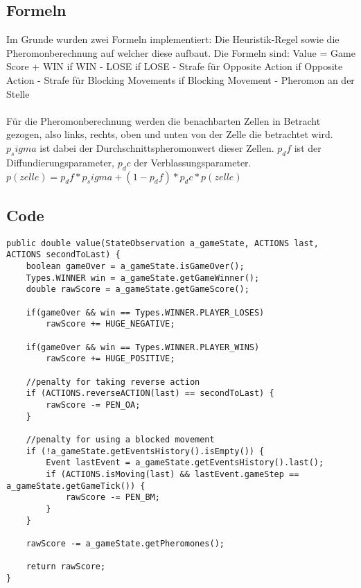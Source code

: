 \documentclass[a4paper]{article}
\begin{document}
\subsection{Formeln}
Im Grunde wurden zwei Formeln implementiert: Die Heuristik-Regel sowie die Pheromonberechnung auf welcher diese aufbaut.
Die Formeln sind:
Value = Game Score + WIN if WIN - LOSE if LOSE - Strafe für Opposite Action if Opposite Action - Strafe für Blocking Movements if Blocking Movement - Pheromon an der Stelle
\paragraph{}
Für die Pheromonberechnung werden die benachbarten Zellen in Betracht gezogen, also links, rechts, oben und unten von der Zelle die betrachtet wird. $p_sigma$ ist dabei der Durchschnittspheromonwert dieser Zellen. $p_df$ ist der Diffundierungsparameter, $p_dc$ der Verblassungsparameter.
$p(zelle) = p_df * p_sigma + (1 - p_df) * p_dc * p(zelle)$

\subsection{Code}
\begin{lstlisting}[title=Heuristik]
public double value(StateObservation a_gameState, ACTIONS last, ACTIONS secondToLast) {
	boolean gameOver = a_gameState.isGameOver();
	Types.WINNER win = a_gameState.getGameWinner();
	double rawScore = a_gameState.getGameScore();

	if(gameOver && win == Types.WINNER.PLAYER_LOSES)
		rawScore += HUGE_NEGATIVE;

	if(gameOver && win == Types.WINNER.PLAYER_WINS)
		rawScore += HUGE_POSITIVE;

	//penalty for taking reverse action
	if (ACTIONS.reverseACTION(last) == secondToLast) {
		rawScore -= PEN_OA;
	}

	//penalty for using a blocked movement
	if (!a_gameState.getEventsHistory().isEmpty()) {
		Event lastEvent = a_gameState.getEventsHistory().last();
		if (ACTIONS.isMoving(last) && lastEvent.gameStep == a_gameState.getGameTick()) {
			rawScore -= PEN_BM;
		}
	}

	rawScore -= a_gameState.getPheromones();

	return rawScore;
}
\end{lstlisting}
\end{document}
